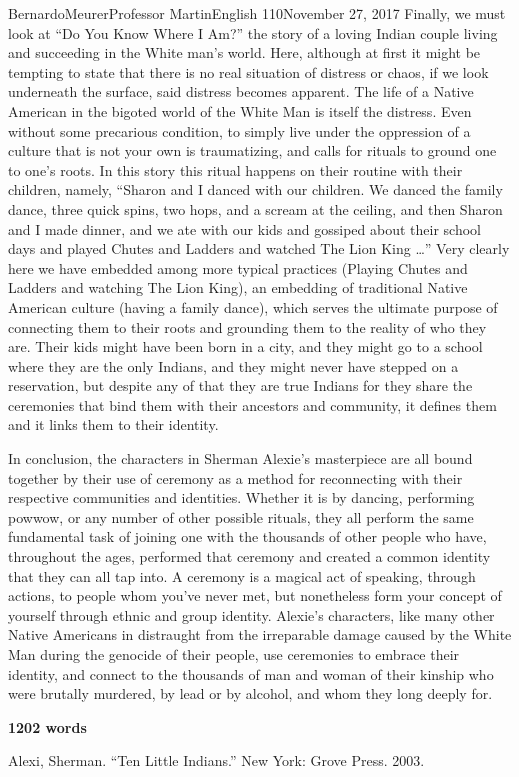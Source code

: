 \documentclass[12pt,letterpaper]{article}
\begin{document}
\begin{mla}{Bernardo}{Meurer}{Professor Martin}{English 110}{November 27, 2017}
        Finally, we must look at ``Do You Know Where I Am?'' the story of a loving Indian couple living and succeeding in the White man's world. Here, although at first it might be tempting to state that there is no real situation of distress or chaos, if we look underneath the surface, said distress becomes apparent. The life of a Native American in the bigoted world of the White Man is itself the distress. Even without some precarious condition, to simply live under the oppression of a culture that is not your own is traumatizing, and calls for rituals to ground one to one's roots. In this story this ritual happens on their routine with their children, namely, ``Sharon and I danced with our children. We danced the family dance, three quick spins, two hops, and a scream at the ceiling, and then Sharon and I made dinner, and we ate with our kids and gossiped about their school days and played Chutes and Ladders and watched The Lion King \ldots'' Very clearly here we have embedded among more typical practices (Playing Chutes and Ladders and watching The Lion King), an embedding of traditional Native American culture (having a family dance), which serves the ultimate purpose of connecting them to their roots and grounding them to the reality of who they are. Their kids might have been born in a city, and they might go to a school where they are the only Indians, and they might never have stepped on a reservation, but despite any of that they are true Indians for they share the ceremonies that bind them with their ancestors and community, it defines them and it links them to their identity.

        In conclusion, the characters in Sherman Alexie's masterpiece are all bound together by their use of ceremony as a method for reconnecting with their respective communities and identities. Whether it is by dancing, performing powwow, or any number of other possible rituals, they all perform the same fundamental task of joining one with the thousands of other people who have, throughout the ages, performed that ceremony and created a common identity that they can all tap into. A ceremony is a magical act of speaking, through actions, to people whom you've never met, but nonetheless form your concept of yourself through ethnic and group identity. Alexie's characters, like many other Native Americans in distraught from the irreparable damage caused by the White Man during the genocide of their people, use ceremonies to embrace their identity, and connect to the thousands of man and woman of their kinship who were brutally murdered, by lead or by alcohol, and whom they long deeply for.
        \begin{flushright}
            \textbf{1202 words}
        \end{flushright}
        \begin{workscited}
            \bibent
            Alexi, Sherman. ``Ten Little Indians.'' New York: Grove Press. 2003.
        \end{workscited}
    \end{mla}
    
\end{document}
